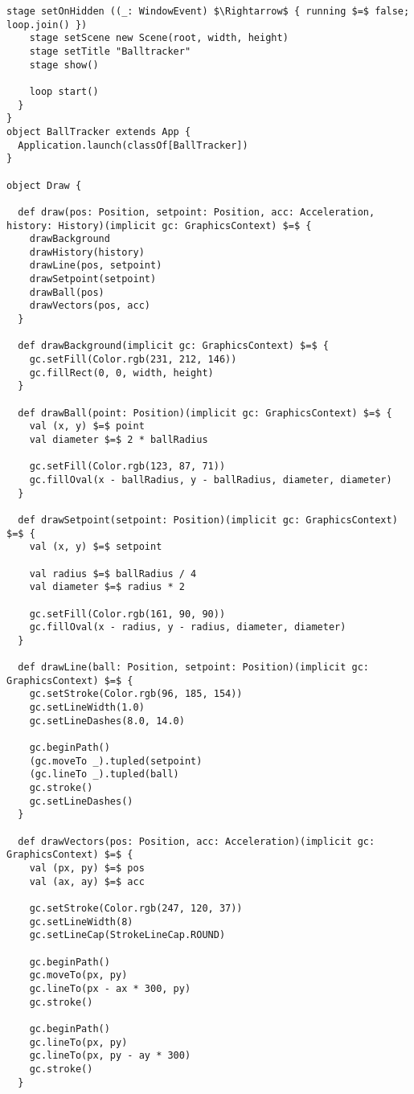 \begin{lstlisting}[style=ScalaStyle, caption={Ball movement control}, label={lst:ball-full}]
    stage setOnHidden ((_: WindowEvent) $\Rightarrow$ { running $=$ false; loop.join() })
    stage setScene new Scene(root, width, height)
    stage setTitle "Balltracker"
    stage show()

    loop start()
  }
}
object BallTracker extends App {
  Application.launch(classOf[BallTracker])
}

object Draw {

  def draw(pos: Position, setpoint: Position, acc: Acceleration, history: History)(implicit gc: GraphicsContext) $=$ {
    drawBackground
    drawHistory(history)
    drawLine(pos, setpoint)
    drawSetpoint(setpoint)
    drawBall(pos)
    drawVectors(pos, acc)
  }

  def drawBackground(implicit gc: GraphicsContext) $=$ {
    gc.setFill(Color.rgb(231, 212, 146))
    gc.fillRect(0, 0, width, height)
  }

  def drawBall(point: Position)(implicit gc: GraphicsContext) $=$ {
    val (x, y) $=$ point
    val diameter $=$ 2 * ballRadius

    gc.setFill(Color.rgb(123, 87, 71))
    gc.fillOval(x - ballRadius, y - ballRadius, diameter, diameter)
  }

  def drawSetpoint(setpoint: Position)(implicit gc: GraphicsContext) $=$ {
    val (x, y) $=$ setpoint

    val radius $=$ ballRadius / 4
    val diameter $=$ radius * 2

    gc.setFill(Color.rgb(161, 90, 90))
    gc.fillOval(x - radius, y - radius, diameter, diameter)
  }

  def drawLine(ball: Position, setpoint: Position)(implicit gc: GraphicsContext) $=$ {
    gc.setStroke(Color.rgb(96, 185, 154))
    gc.setLineWidth(1.0)
    gc.setLineDashes(8.0, 14.0)

    gc.beginPath()
    (gc.moveTo _).tupled(setpoint)
    (gc.lineTo _).tupled(ball)
    gc.stroke()
    gc.setLineDashes()
  }

  def drawVectors(pos: Position, acc: Acceleration)(implicit gc: GraphicsContext) $=$ {
    val (px, py) $=$ pos
    val (ax, ay) $=$ acc

    gc.setStroke(Color.rgb(247, 120, 37))
    gc.setLineWidth(8)
    gc.setLineCap(StrokeLineCap.ROUND)

    gc.beginPath()
    gc.moveTo(px, py)
    gc.lineTo(px - ax * 300, py)
    gc.stroke()

    gc.beginPath()
    gc.lineTo(px, py)
    gc.lineTo(px, py - ay * 300)
    gc.stroke()
  }


\end{lstlisting}
